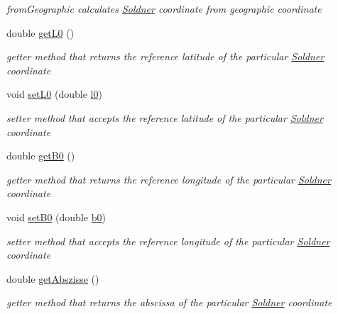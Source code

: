 \begin{DoxyCompactItemize}
\begin{DoxyCompactList}\small\item\em from\+Geographic calculates \hyperlink{classcoordinates_1_1_soldner}{Soldner} coordinate from geographic coordinate \end{DoxyCompactList}\item 
double \hyperlink{classcoordinates_1_1_soldner_a58e4fa59465e0953f6302ea668f2d270}{get\+L0} ()
\begin{DoxyCompactList}\small\item\em getter method that returns the reference latitude of the particular \hyperlink{classcoordinates_1_1_soldner}{Soldner} coordinate \end{DoxyCompactList}\item 
void \hyperlink{classcoordinates_1_1_soldner_abc6b1143ff0485b110cdc7b33f712ed3}{set\+L0} (double \hyperlink{classcoordinates_1_1_soldner_a4d8a0b1f4fce55f1d8be6433a2160b17}{l0})
\begin{DoxyCompactList}\small\item\em setter method that accepts the reference latitude of the particular \hyperlink{classcoordinates_1_1_soldner}{Soldner} coordinate \end{DoxyCompactList}\item 
double \hyperlink{classcoordinates_1_1_soldner_a6ab74bfedc2b81db5ec9b40228b5a51c}{get\+B0} ()
\begin{DoxyCompactList}\small\item\em getter method that returns the reference longitude of the particular \hyperlink{classcoordinates_1_1_soldner}{Soldner} coordinate \end{DoxyCompactList}\item 
void \hyperlink{classcoordinates_1_1_soldner_a597b8292c312c36e547df97285e55d4a}{set\+B0} (double \hyperlink{classcoordinates_1_1_soldner_a489fa7e9e4c0c09e502bbbf2fb7ad689}{b0})
\begin{DoxyCompactList}\small\item\em setter method that accepts the reference longitude of the particular \hyperlink{classcoordinates_1_1_soldner}{Soldner} coordinate \end{DoxyCompactList}\item 
double \hyperlink{classcoordinates_1_1_soldner_a1bb5f8b49d0f2858f22028f3532d1ee3}{get\+Abszisse} ()
\begin{DoxyCompactList}\small\item\em getter method that returns the abscissa of the particular \hyperlink{classcoordinates_1_1_soldner}{Soldner} coordinate \end{DoxyCompactList}\item 

\end{DoxyCompactItemize}
